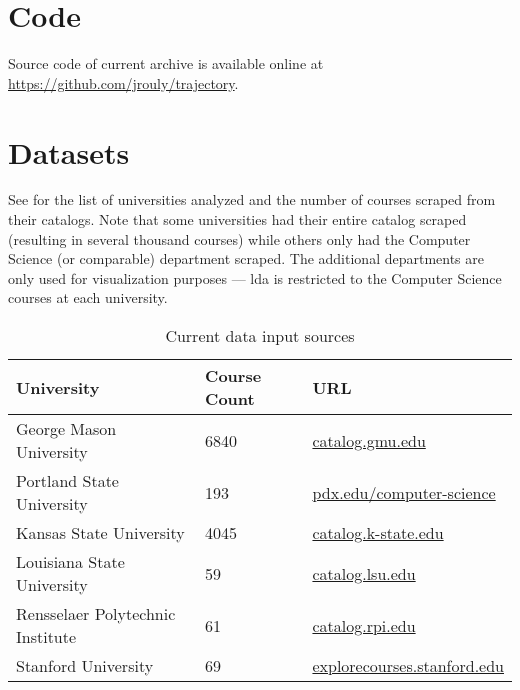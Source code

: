 

\section{Code}
\label{app:code}

Source code of current archive is available online at \href{https://github.com/jrouly/trajectory.git}{https://github.com/jrouly/trajectory}.


\section{Datasets}
\label{app:datasets}

See  for the list of universities analyzed and the number of courses scraped from their catalogs.
Note that some universities had their entire catalog scraped (resulting in several thousand courses) while others only had the Computer Science (or comparable) department scraped.
The additional departments are only used for visualization purposes --- \ac{lda} is restricted to the Computer Science courses at each university.

\begin{table*}[ht]
\centering
\begin{tabular}{lll}
\toprule
University & Course Count & URL \\
\midrule
George Mason University & 6840 & \url{catalog.gmu.edu} \\
Portland State University & 193 & \url{pdx.edu/computer-science} \\
Kansas State University & 4045 & \url{catalog.k-state.edu} \\
Louisiana State University & 59 & \url{catalog.lsu.edu} \\
Rensselaer Polytechnic Institute & 61 & \url{catalog.rpi.edu} \\
Stanford University & 69 & \url{explorecourses.stanford.edu} \\
\bottomrule
\end{tabular}
\caption{Current data input sources\label{table:data-sources}}
\end{table*}


